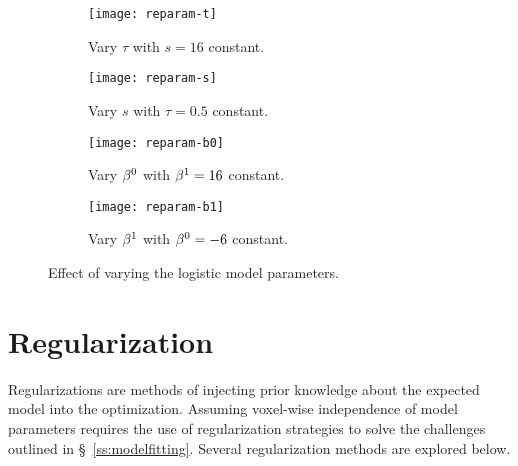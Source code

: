\begin{figure}
  \centering
  \begin{subfigure}{\plotwidth}
    \texttt{[image: reparam-t]}
    \caption{Vary $\tau$ with $s = 16$ constant.}%
    \label{fig:reparam-t}
  \end{subfigure}
  \begin{subfigure}{\plotwidth}
    \texttt{[image: reparam-s]}
    \caption{Vary $s$ with $\tau = 0.5$ constant.}%
    \label{fig:reparam-s}
  \end{subfigure}
  \begin{subfigure}{\plotwidth}
    \texttt{[image: reparam-b0]}
    \caption{Vary $\beta^0$ with $\beta^1 = 16$ constant.}%
    \label{fig:reparam-b0}
  \end{subfigure}
  \begin{subfigure}{\plotwidth}
    \texttt{[image: reparam-b1]}
    \caption{Vary $\beta^1$ with $\beta^0 = -6$ constant.}%
    \label{fig:reparam-b1}
  \end{subfigure}
  \caption{Effect of varying the logistic model parameters.}%
  \label{fig:reparam}
\end{figure}
\section{Regularization}\label{s:vlr-reg}
Regularizations are
methods of injecting prior knowledge about the expected model into the optimization.
Assuming voxel-wise independence of model parameters requires the use of regularization strategies
to solve the challenges outlined in \S~\ref{ss:modelfitting}.
Several regularization methods are explored below.
